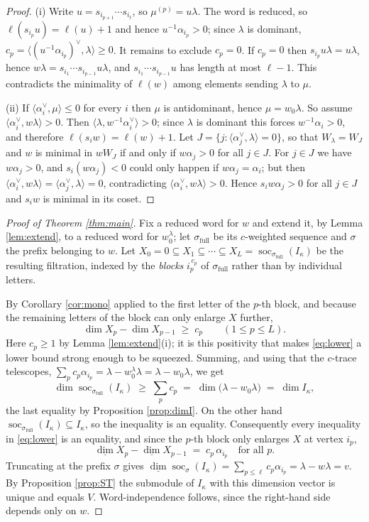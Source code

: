 \documentclass[11pt,reqno]{amsart}
\theoremstyle{plain}
\theoremstyle{definition}
\DeclareMathOperator{\soc}{soc}
\newcommand{\dimv}{\underline{\dim}}
\newcommand{\al}{\alpha}
\newcommand{\la}{\lambda}
\newcommand{\ka}{\kappa}
\begin{document}
\begin{proof}
(i) Write $u=s_{i_{p+1}}\cdots s_{i_\ell}$, so $\mu^{(p)}=u\la$.  The word is
reduced, so $\ell(s_{i_p}u)=\ell(u)+1$ and hence $u^{-1}\al_{i_p}>0$; since
$\la$ is dominant,
$c_p=\langle (u^{-1}\al_{i_p})^\vee,\la\rangle\ge0$.  It remains to exclude
$c_p=0$.  If $c_p=0$
then $s_{i_p}u\la=u\la$, hence
$w\la=s_{i_1}\cdots s_{i_{p-1}}u\la$, and $s_{i_1}\cdots s_{i_{p-1}}u$ has
length at most $\ell-1$.  This contradicts the minimality of $\ell(w)$ among
elements sending $\la$ to $\mu$.

(ii) If $\langle\al_i^\vee,\mu\rangle\le0$ for every $i$ then $\mu$ is
antidominant, hence $\mu=w_0\la$.  So assume
$\langle\al_i^\vee,w\la\rangle>0$.  Then $\langle\la,w^{-1}\al_i^\vee\rangle>0$;
since $\la$ is dominant this forces $w^{-1}\al_i>0$, and therefore
$\ell(s_iw)=\ell(w)+1$.  Let $J=\{j:\langle\al_j^\vee,\la\rangle=0\}$, so that
$W_\la=W_J$ and $w$ is minimal in $wW_J$ if and only if $w\al_j>0$ for all
$j\in J$.  For $j\in J$ we have $w\al_j>0$, and $s_i(w\al_j)<0$ could only
happen if $w\al_j=\al_i$; but then
$\langle\al_i^\vee,w\la\rangle=\langle\al_j^\vee,\la\rangle=0$, contradicting
$\langle\al_i^\vee,w\la\rangle>0$.  Hence $s_iw\al_j>0$ for all $j\in J$ and
$s_iw$ is minimal in its coset.
\end{proof}

\begin{proof}[Proof of Theorem \ref{thm:main}]
Fix a reduced word for $w$ and extend it, by Lemma \ref{lem:extend}, to a
reduced word for $w_0^\la$; let $\sigma_{\mathrm{full}}$ be its $c$-weighted
sequence and $\sigma$ the prefix belonging to $w$.  Let
$X_0=0\subseteq X_1\subseteq\cdots\subseteq X_L=\soc_{\sigma_{\mathrm{full}}}
(I_\ka)$ be the resulting filtration, indexed by the \emph{blocks}
$i_p^{\,c_p}$ of $\sigma_{\mathrm{full}}$ rather than by individual letters.

By Corollary \ref{cor:mono} applied to the first letter of the $p$-th block,
and because the remaining letters of the block can only enlarge $X$ further,
\begin{equation}\label{eq:lower}
  \dim X_p-\dim X_{p-1}\;\ge\;c_p \qquad(1\le p\le L).
\end{equation}
Here $c_p\ge1$ by Lemma \ref{lem:extend}(i); it is this positivity that makes
\eqref{eq:lower} a lower bound strong enough to be squeezed.
Summing, and using that the $c$-trace telescopes,
$\sum_p c_p\al_{i_p}=\la-w_0^\la\la=\la-w_0\la$, we get
\[
  \dim \soc_{\sigma_{\mathrm{full}}}(I_\ka)\;\ge\;
  \sum_p c_p \;=\; \dim\bigl(\la-w_0\la\bigr)\;=\;\dim I_\ka,
\]
the last equality by Proposition \ref{prop:dimI}.  On the other hand
$\soc_{\sigma_{\mathrm{full}}}(I_\ka)\subseteq I_\ka$, so the inequality is an
equality.  Consequently every inequality in \eqref{eq:lower} is an equality,
and since the $p$-th block only enlarges $X$ at vertex $i_p$,
\[
  \dimv X_p-\dimv X_{p-1}\;=\;c_p\,\al_{i_p}\quad\text{for all }p .
\]
Truncating at the prefix $\sigma$ gives
$\dimv\soc_\sigma(I_\ka)=\sum_{p\le \ell}c_p\al_{i_p}=\la-w\la=v$.  By
Proposition \ref{prop:ST} the submodule of $I_\ka$ with this dimension vector
is unique and equals $V$.  Word-independence follows, since the right-hand side
depends only on $w$.
\end{proof}
\end{document}
